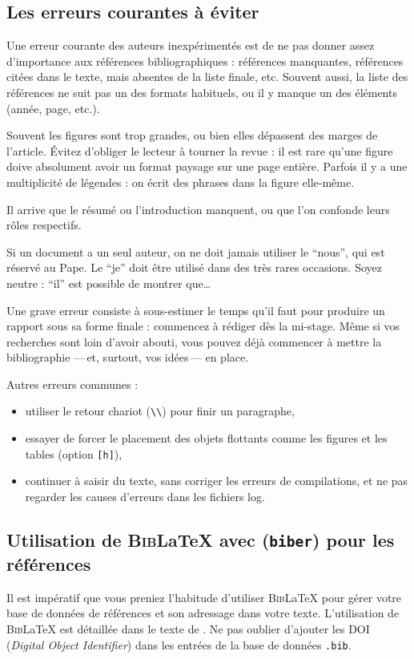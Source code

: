 \documentclass{ipgpmaster}
\begin{document}
\subsection{Les erreurs courantes  à éviter}

Une erreur courante des auteurs inexpérimentés est de ne pas donner assez
 d'importance aux références bibliographiques : références manquantes, 
références citées dans le texte, mais absentes de la liste finale, etc. 
Souvent aussi, la liste des références ne suit pas un des formats habituels, 
ou il y manque un des éléments (année, page, etc.).

Souvent les figures sont trop grandes, ou bien elles dépassent des marges de 
l'article. 
Évitez d'obliger le lecteur à tourner la revue : il est rare qu'une figure
 doive absolument avoir un format paysage sur une page entière.
Parfois il y a une multiplicité de légendes : on écrit des phrases dans la
 figure elle-même.      

Il arrive que le résumé ou l'introduction manquent, ou que l'on confonde 
leurs rôles respectifs.     

Si un document a un seul auteur, on ne doit jamais utiliser le ``nous'',  
qui est réservé au Pape. Le ``je'' doit être utilisé dans des très 
rares occasions. Soyez neutre : ``il'' est possible de montrer que\dots 

Une grave erreur consiste à sous-estimer le temps qu'il faut pour
 produire un rapport sous sa forme finale : commencez à rédiger dès la mi-stage.
Même si vos recherches sont loin d'avoir abouti, vous pouvez déjà commencer
 à mettre la bibliographie ---\,et, surtout, vos idées\,--- en place.
 
 
 Autres erreurs communes :
\begin{itemize}
\item utiliser le retour chariot (\verb"\\") pour finir un paragraphe,
\item essayer de forcer le placement des objets flottants comme les figures et les tables (option \verb"[h]"),
\item continuer à saisir du texte, sans corriger les erreurs de compilations, et ne pas regarder les causes d'erreurs dans les fichiers log.
\end{itemize}



\subsection{Utilisation de \textsc{Bib}\LaTeX{} avec (\texttt{biber}) pour les références}
Il est impératif que vous preniez l'habitude d'utiliser \textsc{Bib}\LaTeX{} 
pour gérer votre
 base de données de références et son adressage dans votre texte. L'utilisation de \textsc{Bib}\LaTeX{} 
est 
 détaillée dans le texte de \cite{moguilnyIntro}. Ne pas oublier d'ajouter les DOI 
 (\textit{Digital Object Identifier}) dans les entrées de la base de données \texttt{.bib}.
\end{document}
